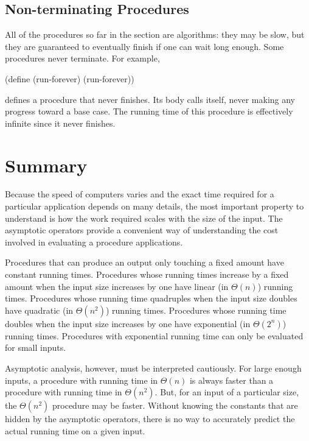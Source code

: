 \begin{schemeregion}
\subsection{Non-terminating Procedures}\label{sec:nonterminating}

All of the procedures so far in the section are algorithms: they may be slow, but they are guaranteed to eventually finish if one can wait long enough.  Some procedures never terminate.  For example,
\begin{schemedisplay}
(define (run-forever) (run-forever))
\end{schemedisplay}
defines a procedure that never finishes.  Its body calls itself, never making any progress toward a base case.  The running time of this procedure is effectively infinite since it never finishes.  

\section{Summary}                              

Because the speed of computers varies and the exact time required for a particular application depends on many details, the most important property to understand is how the work required scales with the size of the input.   The asymptotic operators provide a convenient way of understanding the cost involved in evaluating a procedure applications.  

Procedures that can produce an output only touching a fixed amount have constant running times.  Procedures whose running times increase by a fixed amount when the input size increases by one have linear (in $\Theta(n)$) running times.  Procedures whose running time quadruples when the input size doubles have quadratic (in $\Theta(n^2)$) running times.  Procedures whose running time doubles when the input size increases by one have exponential (in $\Theta(2^n)$) running times.  Procedures with exponential running time can only be evaluated for small inputs.

Asymptotic analysis, however, must be interpreted cautiously.  For large enough inputs, a procedure with running time in $\Theta(n)$ is always faster than a procedure with running time in $\Theta(n^2)$.  But, for an input of a particular size, the $\Theta(n^2)$ procedure may be faster.  Without knowing the constants that are hidden by the asymptotic operators, there is no way to accurately predict the actual running time on a given input.



\end{schemeregion}
